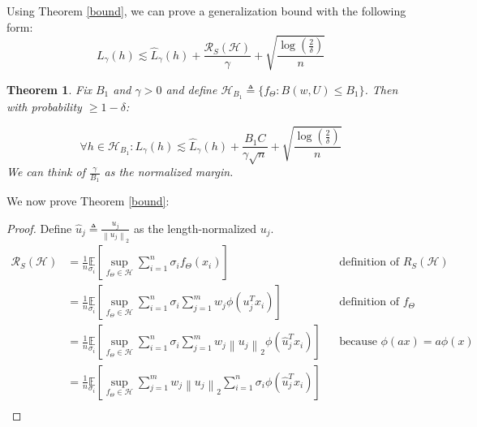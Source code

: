\documentclass[11pt]{article}
\newtheorem{theorem}{Theorem}
\newcommand{\HH}{\mathcal{H}}
\newcommand{\RR}{\mathcal{R}}
\newcommand{\IE}{\mathbb{E}}
\newcommand{\normt}[1]{\left\lVert#1\right\rVert_2}
\begin{document}
Using Theorem \ref{bound}, we can prove a generalization bound with the following form:
$$L_\gamma(h) \lesssim \hat{L}_\gamma(h) + \frac{\RR_S(\HH)}{\gamma}
	+\sqrt{\frac{\log(\frac{2}{\delta})}{n}}$$

\begin{theorem}
	Fix $B_1$ and $\gamma >0$ and define $\HH_{B_1} \triangleq \{f_\Theta: B(w, U) \leq B_1 \}$. Then with probability $\geq 1-\delta$:

	$$\forall h \in \HH_{B_1}: L_\gamma (h) \lesssim \hat{L}_\gamma(h) + \frac{B_1 C}{\gamma \sqrt{n}}
		+ \sqrt{\frac{\log\left(\frac{2}{\delta}\right)}{n}}$$
We can think of $\frac{\gamma}{B_1}$ as the normalized margin.
\end{theorem}


We now prove Theorem \ref{bound}:
\begin{proof} Define $\hat{u}_j \triangleq \frac{u_j}{\normt{u_j}}$ as the length-normalized $u_j$.
	\begin{align*}
		\RR_S(\HH)                                              & = \frac{1}{n} \underset{\sigma_i}{\IE}
		\left[\underset{f_\Theta \in \HH}{\sup} \sum\limits_{i=1}^n
		\sigma_i f_\Theta\left(x_i\right)\right]                           &                                                                                  & \text{definition of } R_S(\HH)   \\
		                                                        & = \frac{1}{n} \underset{\sigma_i}{\IE}
		\left[\underset{f_\Theta \in \HH}{\sup} \sum\limits_{i=1}^n \sigma_i \sum\limits_{j=1}^m
		w_j \phi\left(u_j^T x_i\right)\right]                              &                                                                                  & \text{definition of } f_\Theta   \\
		                                                        & = \frac{1}{n} \underset{\sigma_i}{\IE}
		\left[\underset{f_\Theta \in \HH}{\sup} \sum\limits_{i=1}^n \sigma_i \sum\limits_{j=1}^m
		w_j \normt{u_j} \phi\left(\hat{u}_j^T x_i\right)\right] &                                                                                  & \text{because }\phi(ax)=a\phi(x) \\
		                                                        & = \frac{1}{n} \underset{\sigma_i}{\IE}
		\left[\underset{f_\Theta \in \HH}{\sup} \sum\limits_{j=1}^m w_j \normt{u_j}
			\sum\limits_{i=1}^n \sigma_i \phi\left(\hat{u}_j^T x_i\right)\right]                                                                                                          \\

\end{align*}
\end{proof}
\end{document}
